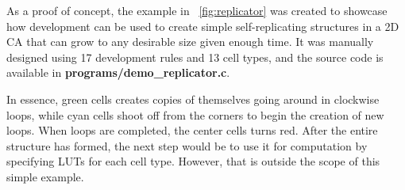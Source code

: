 As a proof of concept, the example in \figurename~\ref{fig:replicator} was created to showcase how development can be used to create simple self-replicating structures in a 2D CA that can grow to any desirable size given enough time.
It was manually designed using 17 development rules and 13 cell types, and the source code is available in \textbf{programs/demo\_replicator.c}.

In essence, green cells creates copies of themselves going around in clockwise loops, while cyan cells shoot off from the corners to begin the creation of new loops.
When loops are completed, the center cells turns red.
After the entire structure has formed, the next step would be to use it for computation by specifying LUTs for each cell type.
However, that is outside the scope of this simple example.


